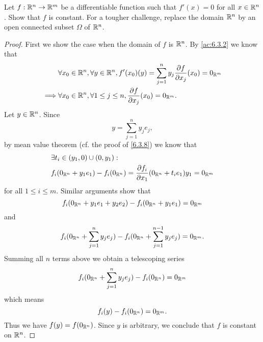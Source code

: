 \begin{ex}\label{ex:6.3.4}
  Let \(f : \mathbb{R}^n \to \mathbb{R}^m\) be a differentiable function such that \(f'(x) = 0\) for all \(x \in \mathbb{R}^n\).
  Show that \(f\) is constant.
  For a tougher challenge, replace the domain \(\mathbb{R}^n\) by an open connected subset \(\Omega\) of \(\mathbb{R}^n\).
\end{ex}

\begin{proof}
  First we show the case when the domain of \(f\) is \(\mathbb{R}^n\).
  By \cref{ac:6.3.2} we know that
  \begin{align*}
             & \forall x_0 \in \mathbb{R}^n, \forall y \in \mathbb{R}^n, f'(x_0)(y) = \sum_{j = 1}^n y_j \dfrac{\partial f}{\partial x_j}(x_0) = 0_{\mathbb{R}^m} \\
    \implies & \forall x_0 \in \mathbb{R}^n, \forall 1 \leq j \leq n, \dfrac{\partial f}{\partial x_j}(x_0) = 0_{\mathbb{R}^m}.
  \end{align*}
  Let \(y \in \mathbb{R}^n\).
  Since
  \[
    y = \sum_{j = 1}^n y_j e_j,
  \]
  by mean value theorem (cf. the proof of \cref{6.3.8}) we know that
  \begin{align*}
     & \exists t_i \in (y_1, 0) \cup (0, y_1) :                                                                        \\
     & f_i(0_{\mathbb{R}^n} + y_1 e_1) - f_i(0_{\mathbb{R}^n}) = \dfrac{\partial f_i}{\partial x_1}(0_{\mathbb{R}^n} + t_i e_1) y_1 = 0_{\mathbb{R}^m}
  \end{align*}
  for all \(1 \leq i \leq m\).
  Similar arguments show that
  \[
    f_i(0_{\mathbb{R}^n} + y_1 e_1 + y_2 e_2) - f_i(0_{\mathbb{R}^n} + y_1 e_1) = 0_{\mathbb{R}^m}
  \]
  and
  \[
    f_i(0_{\mathbb{R}^n} + \sum_{j = 1}^n y_j e_j) - f_i(0_{\mathbb{R}^n} + \sum_{j = 1}^{n - 1} y_j e_j) = 0_{\mathbb{R}^m}.
  \]
  Summing all \(n\) terms above we obtain a telescoping series
  \[
    f_i(0_{\mathbb{R}^n} + \sum_{j = 1}^n y_j e_j) - f_i(0_{\mathbb{R}^n}) = 0_{\mathbb{R}^m}
  \]
  which means
  \[
    f_i(y) - f_i(0_{\mathbb{R}^n}) = 0_{\mathbb{R}^m}.
  \]
  Thus we have \(f(y) = f(0_{\mathbb{R}^n})\).
  Since \(y\) is arbitrary, we conclude that \(f\) is constant on \(\mathbb{R}^n\).


\end{proof}
